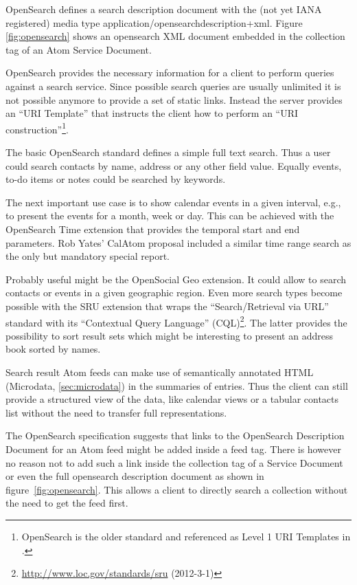 \documentclass[11pt,a4paper,headsepline,twoside]{scrartcl}		%
\newcommand{\citeurl}[2]{\url{#1} (#2)}
\begin{document}
OpenSearch defines a search description document with the (not yet IANA
registered) media type application/opensearchdescription+xml. Figure
\ref{fig:opensearch} shows an opensearch XML document embedded in the collection
tag of an Atom Service Document.

OpenSearch provides the necessary information for a client to perform queries
against a search service. Since possible search queries are usually unlimited it
is not possible anymore to provide a set of static links. Instead the server
provides an ``URI Template'' \cite{RFC6570} that instructs the client how to
perform an ``URI construction''\footnote{OpenSearch is the older standard and
  referenced as Level 1 URI Templates in \cite{RFC6570}.}.

The basic OpenSearch standard defines a simple full text search. Thus a user
could search contacts by name, address or any other field value. Equally events,
to-do items or notes could be searched by keywords.

The next important use case is to show calendar events in a given interval,
e.g., to present the events for a month, week or day. This can be achieved with
the OpenSearch Time extension that provides the temporal start and end
parameters. Rob Yates' CalAtom \cite{draft-yates-atompub-calatom-00.txt} proposal
included a similar time range search as the only but mandatory special report.

Probably useful might be the OpenSocial Geo extension. It could allow to search
contacts or events in a given geographic region. Even more search types become
possible with the SRU extension that wraps the ``Search/Retrieval via URL''
standard with its ``Contextual Query Language''
(CQL)\footnote{\citeurl{http://www.loc.gov/standards/sru}{2012-3-1}}. The latter
provides the possibility to sort result sets which might be interesting to
present an address book sorted by names.

Search result Atom feeds can make use of semantically annotated HTML (Microdata,
\autoref{sec:microdata}) in the summaries of entries. Thus the client can still
provide a structured view of the data, like calendar views or a tabular contacts
list without the need to transfer full representations.

The OpenSearch specification suggests that links to the OpenSearch Description
Document for an Atom feed might be added inside a feed tag. There is however no
reason not to add such a link inside the collection tag of a Service Document or
even the full opensearch description document as shown in
figure~\ref{fig:opensearch}. This allows a client to directly search a
collection without the need to get the feed first.
\end{document}
